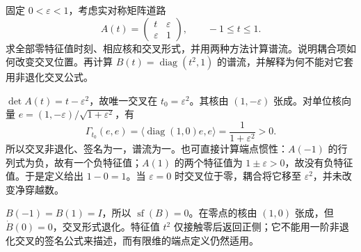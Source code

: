 \begin{exercise}\label{g3:ex:coupled-spectral-crossing}
	固定 \(0<\varepsilon<1\)，考虑实对称矩阵道路
	\[
		A(t)=\begin{pmatrix}t&\varepsilon\\\varepsilon&1\end{pmatrix},
		\qquad -1\le t\le1.
	\]
	求全部零特征值时刻、相应核和交叉形式，并用两种方法计算谱流。说明耦合项如何改变交叉位置。再计算 \(B(t)=\operatorname{diag}(t^2,1)\) 的谱流，并解释为何不能对它套用非退化交叉公式。
\end{exercise}
\begin{solution}
	\(\det A(t)=t-\varepsilon^2\)，故唯一交叉在 \(t_0=\varepsilon^2\)。其核由 \((1,-\varepsilon)\) 张成。对单位核向量
	\(e=(1,-\varepsilon)/\sqrt{1+\varepsilon^2}\)，有
	\[
		\Gamma_{t_0}(e,e)=\langle\operatorname{diag}(1,0)e,e\rangle
		=\frac1{1+\varepsilon^2}>0.
	\]
	所以交叉非退化、签名为一，谱流为一。也可直接计算端点惯性：\(A(-1)\) 的行列式为负，故有一个负特征值；\(A(1)\) 的两个特征值为 \(1\pm\varepsilon>0\)，故没有负特征值。于是定义给出 \(1-0=1\)。当 \(\varepsilon=0\) 时交叉位于零，耦合将它移至 \(\varepsilon^2\)，并未改变净穿越数。

	\(B(-1)=B(1)=I\)，所以 \(\operatorname{sf}(B)=0\)。在零点的核由 \((1,0)\) 张成，但 \(\dot B(0)=0\)，交叉形式退化。特征值 \(t^2\) 仅接触零后返回正侧；它不能用一阶非退化交叉的签名公式来描述，而有限维的端点定义仍然适用。
\end{solution}
